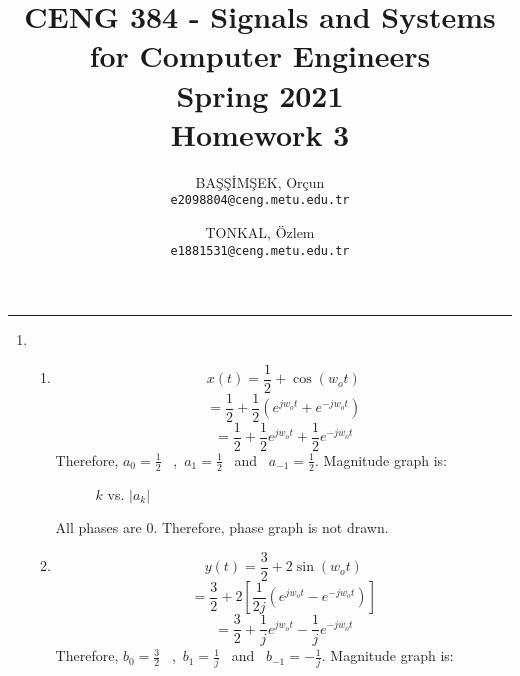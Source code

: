 \documentclass[10pt,a4paper, margin=1in]{article}
\author{
  BAŞŞİMŞEK, Orçun\\
  \texttt{e2098804@ceng.metu.edu.tr}
  \and
  TONKAL, Özlem\\
  \texttt{e1881531@ceng.metu.edu.tr}
}
\title{CENG 384 - Signals and Systems for Computer Engineers \\
Spring 2021 \\
Homework 3}
\begin{document}
\maketitle



\noindent\rule{19cm}{1.2pt}

\begin{enumerate}

\item %
    \begin{enumerate}
    \item %
    \[ x(t) = \frac{1}{2} + \cos(w_ot) \]
    \[ = \frac{1}{2} + \frac{1}{2}(e^{jw_ot} + e^{-jw_ot}) \]
    \[ = \frac{1}{2} + \frac{1}{2}e^{jw_ot} + \frac{1}{2}e^{-jw_ot} \]
    Therefore, $a_0 = \frac{1}{2}$ \ ,\ $a_1 = \frac{1}{2}$ \ and \ $a_{-1} = \frac{1}{2}$. Magnitude graph is:
    
    \begin{figure} [H]
    \centering
    \caption{$k$ vs. $|a_k|$}
    \label{fig:q1a}
\end{figure}

All phases are $0$. Therefore, phase graph is not drawn.

    \item %
    \[ y(t) = \frac{3}{2} + 2\sin(w_ot) \]
    \[ = \frac{3}{2} + 2[\frac{1}{2j}(e^{jw_ot} - e^{-jw_ot})] \]
      \[ = \frac{3}{2} + \frac{1}{j}e^{jw_ot} - \frac{1}{j}e^{-jw_ot} \]
      Therefore, $b_0 = \frac{3}{2}$ \ ,\ $b_1 = \frac{1}{j}$ \ and \ $b_{-1} = - \frac{1}{j}$. Magnitude graph is:
      

\end{enumerate}
\end{enumerate}
\end{document}
